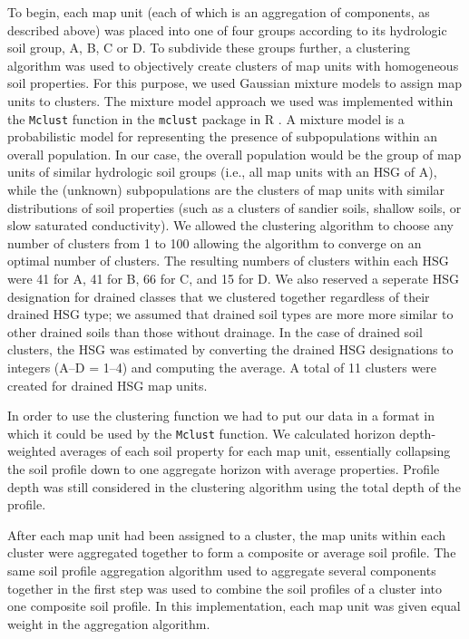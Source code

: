 To begin, each map unit (each of which is an aggregation of components, as
described above) was placed into one of four groups according to its hydrologic
soil group, A, B, C or D. To subdivide these groups further, a clustering
algorithm was used to objectively create clusters of map units with homogeneous
soil properties. For this purpose, we used Gaussian mixture models to assign map
units to clusters. The mixture model approach we used was implemented within the
\texttt{Mclust} function in the \texttt{mclust} package in R
\citep{fraley_mclust_2012}. A mixture model is a probabilistic model for
representing the presence of subpopulations within an overall population. In our
case, the overall population would be the group of map units of similar
hydrologic soil groups (i.e., all map units with an HSG of A), while the
(unknown) subpopulations are the clusters of map units with similar
distributions of soil properties (such as a clusters of sandier soils, shallow
soils, or slow saturated conductivity). We allowed the clustering algorithm to
choose any number of clusters from 1 to 100 allowing the algorithm to converge
on an optimal number of clusters. The resulting numbers of clusters within each
HSG were 41 for A, 41 for B, 66 for C, and 15 for D. We also reserved a seperate
HSG designation for drained classes that we clustered together regardless of
their drained HSG type; we assumed that drained soil types are more more similar
to other drained soils than those without drainage. In the case of drained soil
clusters, the HSG was estimated by converting the drained HSG designations to
integers (A--D = 1--4) and computing the average. A total of 11 clusters were
created for drained HSG map units.

In order to use the clustering function we had to put our data in a format in
which it could be used by the \texttt{Mclust} function. We calculated horizon
depth-weighted averages of each soil property for each map unit, essentially
collapsing the soil profile down to one aggregate horizon with average
properties. Profile depth was still considered in the clustering algorithm using
the total depth of the profile.

After each map unit had been assigned to a cluster, the map units within each
cluster were aggregated together to form a composite or average soil profile.
The same soil profile aggregation algorithm \citep{beaudette_algorithms_2013}
used to aggregate several components together in the first step was used to
combine the soil profiles of a cluster into one composite soil profile. In this
implementation, each map unit was given equal weight in the aggregation
algorithm.


